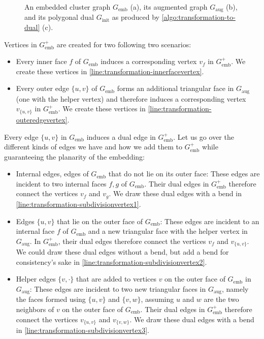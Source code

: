 \begin{figure}[H]
	\caption{An embedded cluster graph $G_\text{emb}$ (a), its augmented graph $G_\text{aug}$ (b), and its polygonal dual $G_\text{init}$ as produced by \cref{algo:transformation-to-dual} (c).}
	\label{fig:transformation-algorithm}
\end{figure}

Vertices in $G_\text{emb}^+$ are created for two following two scenarios:
%
\begin{itemize}
	\item Every inner face $f$ of $G_\text{emb}$ induces a corresponding vertex $v_f$ in $G_\text{emb}^+$. We create these vertices in \cref{line:transformation-innerfacevertex}.
	\item Every outer edge $\{u,v\}$ of $G_\text{emb}$ forms an additional triangular face in $G_\text{aug}$ (one with the helper vertex) and therefore induces a corresponding vertex $v_{\{u,v\}}$ in $G_\text{emb}^+$. We create these vertices in \cref{line:transformation-outeredgevertex}.
\end{itemize}

Every edge $\{u,v\}$ in $G_\text{emb}$ induces a dual edge in $G_\text{emb}^+$. Let us go over the different kinds of edges we have and how we add them to $G_\text{emb}^+$ while guaranteeing the planarity of the embedding:
%
\begin{itemize}
	\item Internal edges, \ie{} edges of $G_\text{emb}$ that do not lie on its outer face: These edges are incident to two internal faces $f, g$ of $G_\text{emb}$. Their dual edges in $G_\text{emb}^+$ therefore connect the vertices $v_f$ and $v_g$. We draw these dual edges with a bend in \cref{line:transformation-subdivisionvertex1}.
	\item Edges $\{u,v\}$ that lie on the outer face of $G_\text{emb}$: These edges are incident to an internal face $f$ of $G_\text{emb}$ and a new triangular face with the helper vertex in $G_\text{aug}$. In $G_\text{emb}^+$, their dual edges therefore connect the vertices $v_f$ and $v_{\{u,v\}}$. We could draw these dual edges without a bend, but add a bend for consistency's sake in \cref{line:transformation-subdivisionvertex2}.
	\item Helper edges $\{v,\cdot\}$ that are added to vertices $v$ on the outer face of $G_\text{emb}$ in $G_\text{aug}$: These edges are incident to two new triangular faces in $G_\text{aug}$, namely the faces formed using $\{u,v\}$ and $\{v,w\}$, assuming $u$ and $w$ are the two neighbors of $v$ on the outer face of $G_\text{emb}$. Their dual edges in $G_\text{emb}^+$ therefore connect the vertices $v_{\{u,v\}}$ and $v_{\{v,w\}}$. We draw these dual edges with a bend in \cref{line:transformation-subdivisionvertex3}.
\end{itemize}

